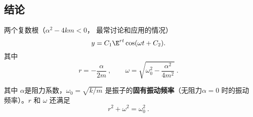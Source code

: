 
\subsection{结论}
两个复数根（$\alpha ^2 - 4km < 0$， 最常讨论和应用的情况）
\begin{equation}
y = C_1 \E^{rt} \cos(\omega t + C_2).
\end{equation}
其中
\begin{equation}
r =  - \frac{\alpha }{2m} ~,\qquad  \omega  = \sqrt{\omega_0^2 - \frac{\alpha ^2}{4 m^2}}~.
\end{equation}

其中 $\alpha$是阻力系数，$\omega_0 = \sqrt{k/m}$ 是振子的\textbf{固有振动频率}（无阻力$\alpha  = 0$ 时的振动频率）。$r$ 和 $\omega$ 还满足
\begin{equation}
r^2 + \omega ^2 = \omega_0^2~.
\end{equation}

